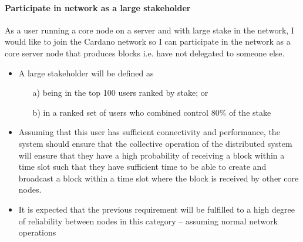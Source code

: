 \documentclass{report}
\theoremstyle{definition}{
  \newtheorem{lemma}{Lemma}[section] %
  \newtheorem{definition}[lemma]{Definition}
}
\theoremstyle{theorem}{
  \newtheorem{invariant}[lemma]{Invariant}
  \newtheorem{proofobligation}[lemma]{Proof Obligation}
}
\numberwithin{equation}{lemma}
\begin{document}
\paragraph{Participate in network as a large stakeholder}

As a user running a core node on a server and with large stake in the network,
I would like to join the Cardano network so I can participate in the network as
a core server node that produces blocks i.e. have not delegated to someone else.

\begin{itemize}
\item A large stakeholder will be defined as
      \begin{itemize}
      \item[a)] being in the top 100 users ranked by stake; or
      \item[b)] in a ranked set of users who combined control 80\% of the stake
      \end{itemize}
\item Assuming that this user has sufficient connectivity and performance, the
      system should ensure that the collective operation of the distributed
      system will ensure that they have a high probability of receiving a
      block within a time slot such that they have sufficient time to be able
      to create and broadcast a block within a time slot where the block is
      received by other core nodes.
\item It is expected that the previous requirement will be fulfilled to a high
      degree of reliability between nodes in this category -- assuming normal
      network operations


\end{itemize}
\end{document}
